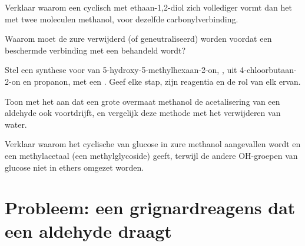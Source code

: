 \begin{exercise}[$\star\star$]\label{exo:b1:acetals-protection:8}
Verklaar waarom een cyclisch  met ethaan-1,2-diol zich
vollediger vormt dan het  met twee moleculen methanol, voor
dezelfde carbonylverbinding.
\end{exercise}

\begin{exercise}[$\star\star$]\label{exo:b1:acetals-protection:9}
Waarom moet de zure  verwijderd (of geneutraliseerd) worden
voordat een beschermde verbinding met een  behandeld
wordt?
\end{exercise}

\begin{exercise}[$\star\star\star$]\label{exo:b1:acetals-protection:10}
Stel een synthese voor van 5-hydroxy-5-methylhexaan-2-on,
, uit 4-chloorbutaan-2-on en propanon, met een
. Geef elke stap, zijn reagentia en de rol van elk ervan.
\end{exercise}

\begin{exercise}[$\star\star\star$]\label{exo:b1:acetals-protection:11}
Toon met het  aan dat een grote overmaat methanol de
acetalisering van een aldehyde ook voortdrijft, en vergelijk deze methode
met het verwijderen van water.
\end{exercise}

\begin{exercise}[$\star\star\star$]\label{exo:b1:acetals-protection:12}
Verklaar waarom het cyclische  van glucose in zure methanol
aangevallen wordt en een methylacetaal (een methylglycoside) geeft,
terwijl de andere OH-groepen van glucose niet in ethers omgezet worden.
\end{exercise}

\section{Probleem: een grignardreagens dat een aldehyde draagt}

